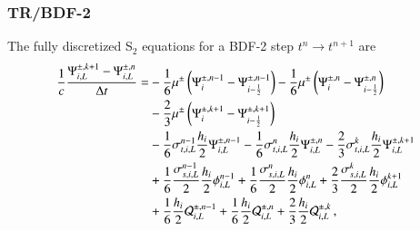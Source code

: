 \documentclass[preprint,12pt]{elsarticle}
\begin{document}
\subsubsection{TR/BDF-2}
The fully discretized S$_2$ equations for a BDF-2 step
$t^{n}\rightarrow t^{n+1}$ are
\begin{equation}\lequ{S2BDF2fullL}\begin{split}
  \frac{1}{c}\frac{\Psi\iL^{\pm,k+1}-\Psi\iL^{\pm,n}}{\dt} = &
   -\sixth\mu^\pm\fn{\Psi^{\pm,n-1}_i - \Psi^{\pm,n-1}_{i-\half}}
   -\sixth\mu^\pm\fn{\Psi^{\pm,n}_i - \Psi^{\pm,n}_{i-\half}}\\
  &-\frac{2}{3}\mu^\pm\fn{\Psi^{\pm,k+1}_i - \Psi^{\pm,k+1}_{i-\half}}\\
  &-\sixth\sigma_{t,i,L}^{n-1}\frac{h_i}{2}\Psi\iL^{\pm,n-1}
   -\sixth\sigma_{t,i,L}^{n}  \frac{h_i}{2}\Psi\iL^{\pm,n}
   -\frac{2}{3}\sigma_{t,i,L}^k\frac{h_i}{2}\Psi\iL^{\pm,k+1}\\
  &+\sixth\frac{\sigma_{s,i,L}^{n-1}}{2}\frac{h_i}{2}\phi\iL^{n-1}
   +\sixth\frac{\sigma_{s,i,L}^{n}}{2}  \frac{h_i}{2}\phi\iL^{n}
   +\frac{2}{3}\frac{\sigma_{s,i,L}^k}{2}\frac{h_i}{2}\phi\iL^{k+1}\\
  &+\sixth\frac{h_i}{2}\Q_{i,L}^{\pm,n-1}
   +\sixth\frac{h_i}{2}\Q_{i,L}^{\pm,n}
   +\frac{2}{3}\frac{h_i}{2}\Q_{i,L}^{\pm,k} \pec
\end{split}\end{equation}
\end{document}

